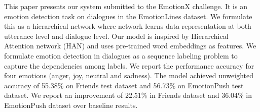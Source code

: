 This paper presents our system submitted to the EmotionX challenge. It is an emotion detection task on dialogues in the EmotionLines dataset. We formulate this as a hierarchical network where network learns data representation at both utterance level and dialogue level. Our model is inspired by Hierarchical Attention network (HAN) and uses pre-trained word embeddings as features. We formulate emotion detection in dialogues as a sequence labeling problem to capture the dependencies among labels. We report the performance accuracy for four emotions (anger, joy, neutral and sadness). The model achieved unweighted accuracy of 55.38\% on Friends test dataset and 56.73\% on EmotionPush test dataset. We report an improvement of 22.51\% in Friends dataset and 36.04\% in EmotionPush dataset over baseline results.
